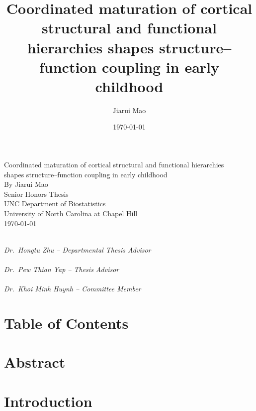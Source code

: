 \documentclass[12pt]{article}
\title{Coordinated maturation of cortical structural and functional hierarchies shapes structure--function coupling in early childhood}
\author{Jiarui Mao}
\date{\today}
\begin{document}
\begin{titlepage}
    \centering
    \vspace*{1.2cm}
    {\LARGE Coordinated maturation of cortical structural and functional hierarchies}\\[0.3cm]
    {\LARGE shapes structure--function coupling in early childhood}\\[1.0cm]

    {\large By Jiarui Mao}\\[0.9cm]

    {\large Senior Honors Thesis}\\[0.15cm]
    {\large UNC Department of Biostatistics}\\[0.15cm]
    {\large University of North Carolina at Chapel Hill}\\[0.3cm]
    {\large \today}

    \vfill

    \begin{flushright}
    \noindent\makebox[3.1in]{\hrulefill}\\[-0.05cm]
    \noindent\textit{Dr.\ Hongtu Zhu -- Departmental Thesis Advisor}\\[0.8cm]

    \noindent\makebox[3.1in]{\hrulefill}\\[-0.05cm]
    \noindent\textit{Dr.\ Pew Thian Yap -- Thesis Advisor}\\[0.8cm]

    \noindent\makebox[3.1in]{\hrulefill}\\[-0.05cm]
    \noindent\textit{Dr.\ Khoi Minh Huynh -- Committee Member}
    \end{flushright}
\end{titlepage}


\section*{Table of Contents}
\tableofcontents

\clearpage
{}

\section{Abstract}


\section{Introduction}

\end{document}
